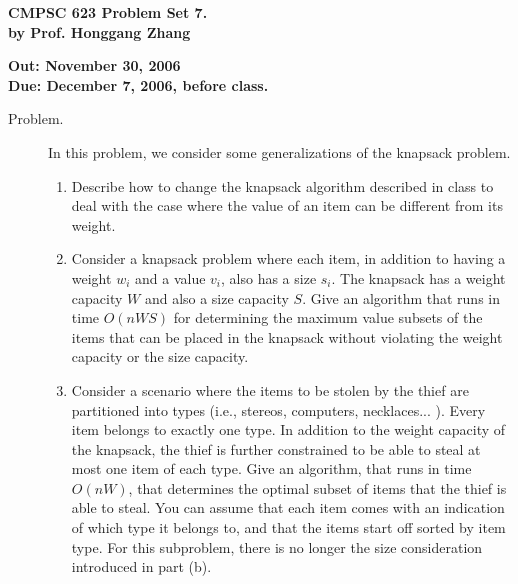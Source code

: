 \documentclass[11pt]{article}
\begin{document}

\begin{center}
{\bf CMPSC 623 Problem Set 7. } \\
{\bf by Prof. Honggang Zhang} \\
\end{center}
\begin{center}
{\bf Out: November 30, 2006} \\
{\bf Due: December 7, 2006, before class.} \\

\end{center}


\begin{description}

\item[Problem.]

In this problem, we consider some generalizations of the knapsack problem.

\begin{enumerate}
\item Describe how to change the knapsack algorithm described in class to deal with the case where
the value of an item can be different from its weight.

\item Consider a knapsack problem where each item, in addition to having a weight $w_i$ and a
value $v_i$, also has a size $s_i$. The knapsack has a weight capacity $W$ and also a size capacity
$S$. Give an algorithm that runs in time $O(nWS)$ for determining the maximum value subsets of the
items that can be placed in the knapsack without violating the weight capacity or the size
capacity.

\item Consider a scenario where the items to be stolen by the thief are partitioned into types
(i.e., stereos, computers, necklaces... ). Every item belongs to exactly one type. In addition to
the weight capacity of the knapsack, the thief is further constrained to be able to steal at most
one item of each type. Give an algorithm, that runs in time $O(nW)$, that determines the optimal
subset of items that the thief is able to steal. You can assume that each item comes with an
indication of which type it belongs to, and that the items start off sorted by item type. For this
subproblem, there is no longer the size consideration introduced in part (b).


\end{enumerate}


\end{description}
\end{document}
